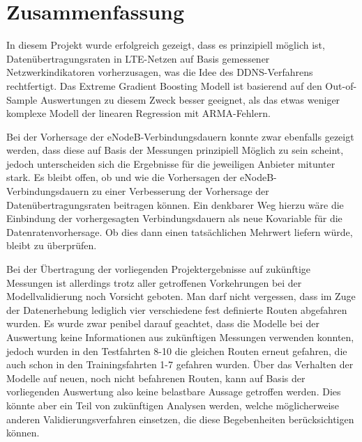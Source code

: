 \section{Zusammenfassung}

In diesem Projekt wurde erfolgreich gezeigt, dass es prinzipiell m\"oglich ist, Daten\"ubertragungsraten in LTE-Netzen
auf Basis gemessener Netzwerkindikatoren vorherzusagen, was die Idee des DDNS-Verfahrens rechtfertigt.
Das Extreme Gradient Boosting Modell ist basierend auf den Out-of-Sample Auswertungen zu diesem Zweck besser geeignet,
als das etwas weniger komplexe Modell der linearen Regression mit ARMA-Fehlern.

Bei der Vorhersage der eNodeB-Verbindungsdauern konnte zwar ebenfalls gezeigt werden, dass diese auf Basis der Messungen
prinzipiell M\"oglich zu sein scheint, jedoch unterscheiden sich die Ergebnisse f\"ur die jeweiligen Anbieter mitunter stark.
Es bleibt offen, ob und wie die Vorhersagen der eNodeB-Verbindungsdauern zu einer Verbesserung der Vorhersage der
Daten\"ubertragungsraten beitragen k\"onnen. Ein denkbarer Weg hierzu w\"are die Einbindung der vorhergesagten Verbindungsdauern
als neue Kovariable f\"ur die Datenratenvorhersage. Ob dies dann einen tats\"achlichen Mehrwert liefern w\"urde, bleibt zu \"uberpr\"ufen.

Bei der \"Ubertragung der vorliegenden Projektergebnisse auf zuk\"unftige Messungen ist allerdings trotz aller getroffenen Vorkehrungen
bei der Modellvalidierung noch Vorsicht geboten. Man darf nicht vergessen, dass im Zuge der Datenerhebung lediglich vier verschiedene
fest definierte Routen abgefahren wurden. Es wurde zwar penibel darauf geachtet, dass die Modelle bei der Auswertung keine
Informationen aus zuk\"unftigen Messungen verwenden konnten, jedoch wurden in den Testfahrten 8-10 die gleichen Routen erneut
gefahren, die auch schon in den Trainingsfahrten 1-7 gefahren wurden.
\"Uber das Verhalten der Modelle auf neuen, noch nicht befahrenen Routen, kann auf Basis der vorliegenden Auswertung also keine
belastbare Aussage getroffen werden. Dies k\"onnte aber ein Teil von zuk\"unftigen Analysen werden,
welche m\"oglicherweise anderen Validierungsverfahren einsetzen,
die diese Begebenheiten ber\"ucksichtigen k\"onnen.
